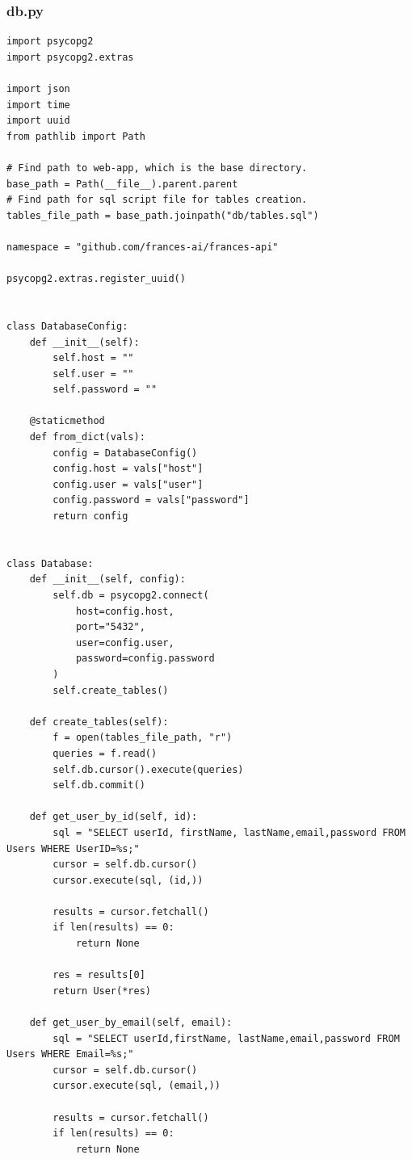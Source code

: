 \documentclass[12pt, letterpaper]{article}
\begin{document}
\subsubsection{db.py}\label{appendix:db.py}
\begin{verbatim}
import psycopg2
import psycopg2.extras

import json
import time
import uuid
from pathlib import Path

# Find path to web-app, which is the base directory.
base_path = Path(__file__).parent.parent
# Find path for sql script file for tables creation.
tables_file_path = base_path.joinpath("db/tables.sql")

namespace = "github.com/frances-ai/frances-api"

psycopg2.extras.register_uuid()


class DatabaseConfig:
    def __init__(self):
        self.host = ""
        self.user = ""
        self.password = ""

    @staticmethod
    def from_dict(vals):
        config = DatabaseConfig()
        config.host = vals["host"]
        config.user = vals["user"]
        config.password = vals["password"]
        return config


class Database:
    def __init__(self, config):
        self.db = psycopg2.connect(
            host=config.host,
            port="5432",
            user=config.user,
            password=config.password
        )
        self.create_tables()

    def create_tables(self):
        f = open(tables_file_path, "r")
        queries = f.read()
        self.db.cursor().execute(queries)
        self.db.commit()

    def get_user_by_id(self, id):
        sql = "SELECT userId, firstName, lastName,email,password FROM Users WHERE UserID=%s;"
        cursor = self.db.cursor()
        cursor.execute(sql, (id,))

        results = cursor.fetchall()
        if len(results) == 0:
            return None

        res = results[0]
        return User(*res)

    def get_user_by_email(self, email):
        sql = "SELECT userId,firstName, lastName,email,password FROM Users WHERE Email=%s;"
        cursor = self.db.cursor()
        cursor.execute(sql, (email,))

        results = cursor.fetchall()
        if len(results) == 0:
            return None


\end{verbatim}
\end{document}
